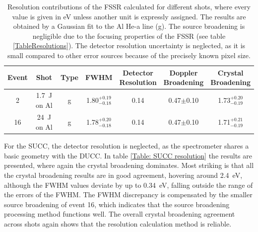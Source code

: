\begin{table}[H]
	\centering
	\caption{Resolution contributions of the FSSR calculated for different shots, where every value is given in eV unless another unit is expressly assigned. The results are obtained by a Gaussian fit to the Al He-a line (g). The source broadening is negligible due to the focusing properties of the FSSR (see table \ref{TableResolutions}). The detector resolution uncertainty is neglected, as it is small compared to other error sources because of the precisely known pixel size.}
	\vspace{0.05cm}
	\renewcommand{\arraystretch}{1.5}
	\centering
	\begin{tabular}{|c|c|c|c|c|c|c|} 
		\hline
		Event & Shot & Type & FWHM & \makecell{Detector \\ Resolution} & \makecell{Doppler \\ Broadening} & \makecell{Crystal \\ Broadening} \\ 
		[0.5ex]
		\hline\hline
		2 & \SI{1.7}{\joule} on Al & g & 1.80$^{+0.19}_{-0.18}$ & 0.14 & 0.47$\pm$0.10 & 
		1.73$^{+0.20}_{-0.19}$ \\ 
		[0.5ex]
		\hline
		16 & \SI{24}{\joule} on Al & g & 1.78$^{+0.20}_{-0.18}$ & 0.14 & 0.47$\pm$0.10 & 
		1.71$^{+0.21}_{-0.19}$ \\ 
		[0.5ex]
		\hline
	\end{tabular}
	\label{Table: FSSR resolution}
\end{table}

For the SUCC, the detector resolution is neglected, as the spectrometer shares a basic geometry with the DUCC. In table \ref{Table: SUCC resolution} the results are presented, where again the crystal broadening dominates. Most striking is that all the crystal broadening results are in good agreement, hovering around \SI{2.4}{\electronvolt}, although the FWHM values deviate by up to \SI{0.34}{\electronvolt}, falling outside the range of the errors of the FWHM. The FWHM discrepancy is compensated by the smaller source broadening of event 16, which indicates that the source broadening processing method functions well. The overall crystal broadening agreement across shots again shows that the resolution calculation method is reliable.

